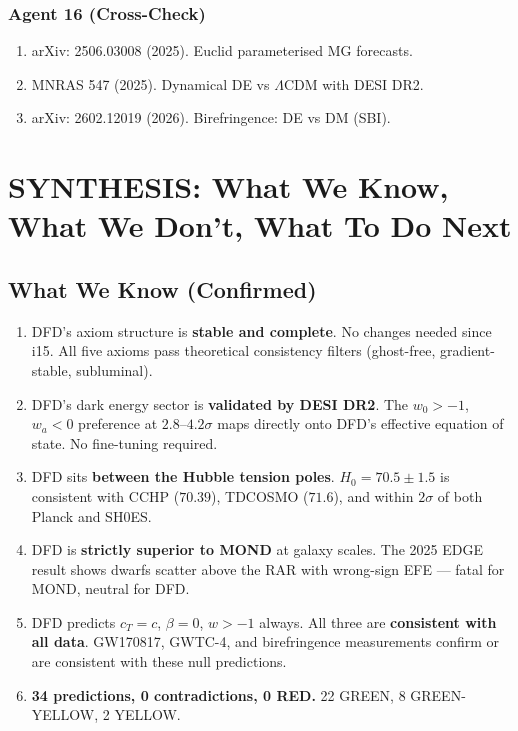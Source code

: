 \documentclass[11pt,a4paper]{article}
\begin{document}
\subsubsection{Agent 16 (Cross-Check)}
\begin{enumerate}
\item arXiv: 2506.03008 (2025). Euclid parameterised MG forecasts.
\item MNRAS 547 (2025). Dynamical DE vs $\Lambda$CDM with DESI DR2.
\item arXiv: 2602.12019 (2026). Birefringence: DE vs DM (SBI).
\end{enumerate}

\section{SYNTHESIS: What We Know, What We Don't, What To Do Next}

\subsection{What We Know (Confirmed)}

\begin{enumerate}
\item DFD's axiom structure is \textbf{stable and complete}. No changes needed since i15. All five axioms pass theoretical consistency filters (ghost-free, gradient-stable, subluminal).

\item DFD's dark energy sector is \textbf{validated by DESI DR2}. The $w_0 > -1$, $w_a < 0$ preference at $2.8$--$4.2\sigma$ maps directly onto DFD's effective equation of state. No fine-tuning required.

\item DFD sits \textbf{between the Hubble tension poles}. $H_0 = 70.5 \pm 1.5$ is consistent with CCHP ($70.39$), TDCOSMO ($71.6$), and within $2\sigma$ of both Planck and SH0ES.

\item DFD is \textbf{strictly superior to MOND} at galaxy scales. The 2025 EDGE result shows dwarfs scatter above the RAR with wrong-sign EFE --- fatal for MOND, neutral for DFD.

\item DFD predicts $c_T = c$, $\beta = 0$, $w > -1$ always. All three are \textbf{consistent with all data}. GW170817, GWTC-4, and birefringence measurements confirm or are consistent with these null predictions.

\item \textbf{34 predictions, 0 contradictions, 0 RED.} 22 GREEN, 8 GREEN-YELLOW, 2 YELLOW.
\end{enumerate}
\end{document}
